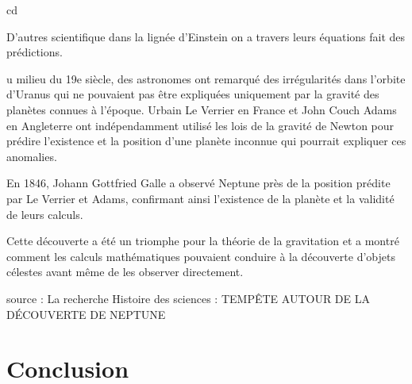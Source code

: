 cd\documentclass{article}
\begin{document}
D'autres scientifique dans la lignée d'Einstein on a travers leurs équations fait des prédictions. 

u milieu du 19e siècle, des astronomes ont remarqué des irrégularités dans l'orbite d'Uranus qui ne pouvaient pas être expliquées uniquement par la gravité des planètes connues à l'époque. Urbain Le Verrier en France et John Couch Adams en Angleterre ont indépendamment utilisé les lois de la gravité de Newton pour prédire l'existence et la position d'une planète inconnue qui pourrait expliquer ces anomalies.

En 1846, Johann Gottfried Galle a observé Neptune près de la position prédite par Le Verrier et Adams, confirmant ainsi l'existence de la planète et la validité de leurs calculs.

Cette découverte a été un triomphe pour la théorie de la gravitation et a montré comment les calculs mathématiques pouvaient conduire à la découverte d'objets célestes avant même de les observer directement.

source : La recherche Histoire des sciences : TEMPÊTE AUTOUR DE LA DÉCOUVERTE DE NEPTUNE
\section{Conclusion}
\end{document}
